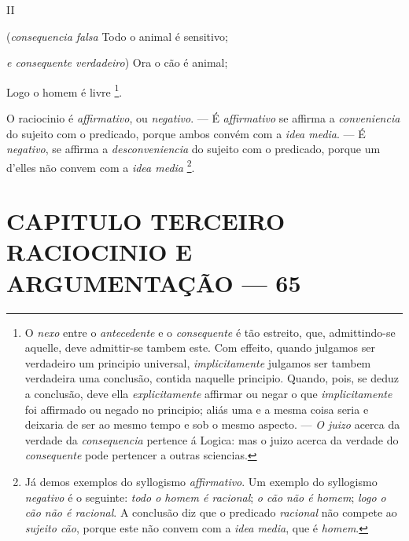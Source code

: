 II

(\emph{consequencia falsa}   Todo o animal é sensitivo;

\emph{e consequente verdadeiro}) Ora o cão é animal;

Logo o homem é livre \footnote{O \emph{nexo} entre o \emph{antecedente} e o \emph{consequente} é tão estreito, que, admittindo-se aquelle, deve admittir-se tambem este. Com effeito, quando julgamos ser verdadeiro um principio universal, \emph{implicitamente} julgamos ser tambem verdadeira uma conclusão, contida naquelle principio. Quando, pois, se deduz a conclusão, deve ella \emph{explicitamente} affirmar ou negar o que \emph{implicitamente} foi affirmado ou negado no principio; aliás uma e a mesma coisa seria e deixaria de ser ao mesmo tempo e sob o mesmo aspecto. --- \emph{O juizo} acerca da verdade da \emph{consequencia} pertence á Logica: mas o juizo acerca da verdade do \emph{consequente} pode pertencer a outras sciencias.}.


 
O raciocinio é \emph{affirmativo}, ou \emph{negativo}. --- É \emph{affirmativo} se affirma a \emph{conveniencia} do sujeito com o predicado, porque ambos convém com a \emph{idea media}. --- É \emph{negativo}, se affirma a \emph{desconveniencia} do sujeito com o predicado, porque um d'elles não convem com a \emph{idea media} \footnote{Já demos exemplos do syllogismo \emph{affirmativo}. Um exemplo do syllogismo \emph{negativo} é o seguinte: \emph{todo o homem é racional}; \emph{o cão não é homem}; \emph{logo o cão não é racional}. A conclusão diz que o predicado \emph{racional} não compete ao \emph{sujeito cão}, porque este não convem com a \emph{idea media}, que é \emph{homem}.}.


\chapter*{CAPITULO TERCEIRO\\[0.3em]\large RACIOCINIO E ARGUMENTAÇÃO --- 65}


